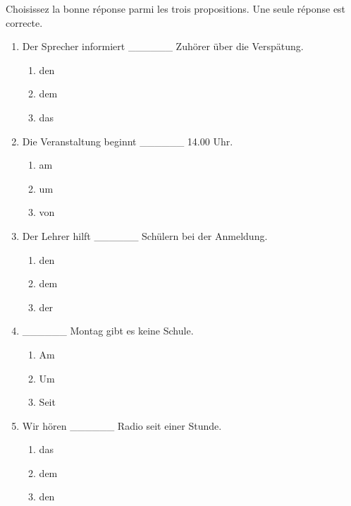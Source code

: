 \documentclass[11pt]{article}
\begin{document}
\begin{exercice}
Choisissez la bonne réponse parmi les trois propositions. Une seule réponse est correcte.
\begin{enumerate}
\item Der Sprecher informiert \_\_\_\_\_\_ Zuhörer über die Verspätung.
  \begin{enumerate}
  \item den \item dem \item das
  \end{enumerate}
\item Die Veranstaltung beginnt \_\_\_\_\_\_ 14.00 Uhr.
  \begin{enumerate}
  \item am \item um \item von
  \end{enumerate}
\item Der Lehrer hilft \_\_\_\_\_\_ Schülern bei der Anmeldung.
  \begin{enumerate}
  \item den \item dem \item der
  \end{enumerate}
\item \_\_\_\_\_\_ Montag gibt es keine Schule.
  \begin{enumerate}
  \item Am \item Um \item Seit
  \end{enumerate}
\item Wir hören \_\_\_\_\_\_ Radio seit einer Stunde.
  \begin{enumerate}
  \item das \item dem \item den
  \end{enumerate}
\end{enumerate}
\end{exercice}
\end{document}
